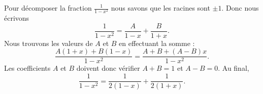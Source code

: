 \begin{example}
    Pour décomposer la fraction \( \frac{1}{ 1-x^2 }\) nous savons que les racines sont \( \pm 1\). Donc nous écrivons
    \begin{equation}
        \frac{1}{ 1-x^2 }=\frac{ A }{ 1-x }+\frac{ B }{ 1+x }.
    \end{equation}
    Nous trouvons les valeurs de \( A\) et \( B\) en effectuant la somme : 
    \begin{equation}
        \frac{ A(1+x)+B(1-x) }{ 1-x^2 }=\frac{ A+B+(A-B)x }{ 1-x^2 }.
    \end{equation}
    Les coefficients \( A\) et \( B\) doivent donc vérifier \( A+B=1\) et \( A-B=0\). Au final,
    \begin{equation}
        \frac{1}{ 1-x^2 }=\frac{1}{ 2(1-x) }+\frac{1}{ 2(1+x) }.
    \end{equation}
\end{example}

